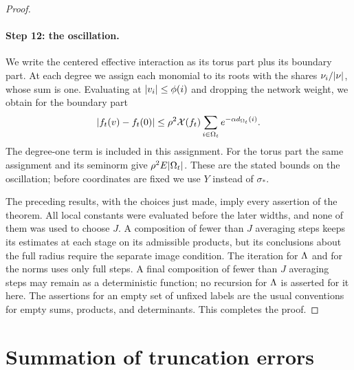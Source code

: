 \begin{proof}
\paragraph{Step 12: the oscillation.}
We write the centered effective interaction as its torus part plus its boundary part. At each degree we assign each monomial to its roots with the shares $\nu_i/\lvert \nu\rvert$, whose sum is one. Evaluating at $\lvert v_i\rvert\le\phi(i)$ and dropping the network weight, we obtain for the boundary part
\[
 \lvert f_t(v)-f_t(0)\rvert\le\rho^2\mathcal X(f_t)\sum_{i\in\Omega_t}e^{-\alpha d_{\Omega_t}(i)}.
\]
The degree-one term is included in this assignment. For the torus part the same assignment and its seminorm give $\rho^2E\lvert \Omega_t\rvert$. These are the stated bounds on the oscillation; before coordinates are fixed we use $Y$ instead of $\sigma_*$.

The preceding results, with the choices just made, imply every assertion of the theorem. All local constants were evaluated before the later widths, and none of them was used to choose $J$. A composition of fewer than $J$ averaging steps keeps its estimates at each stage on its admissible products, but its conclusions about the full radius require the separate image condition. The iteration for $\Lambda$ and for the norms uses only full steps. A final composition of fewer than $J$ averaging steps may remain as a deterministic function; no recursion for $\Lambda$ is asserted for it here. The assertions for an empty set of unfixed labels are the usual conventions for empty sums, products, and determinants. This completes the proof.
\end{proof}

\section{Summation of truncation errors}\label{ch17:sec:endpoint}

